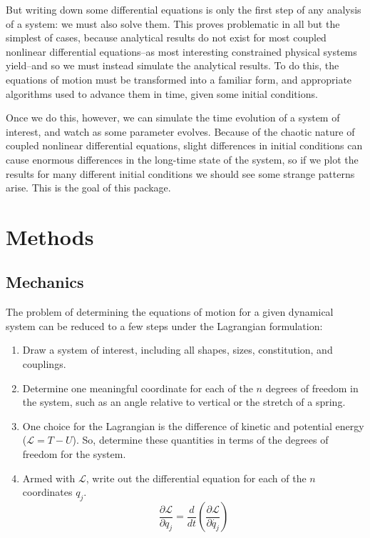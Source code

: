 \documentclass{article}
\newcommand{\lagrangian}{\ensuremath{\mathcal{L}}}
\newcommand{\ddt}{\frac{d}{dt}}
\begin{document}
But writing down some differential equations is only the first step of any analysis of a system: we must also solve them. This proves problematic in all but the simplest of cases, because analytical results do not exist for most coupled nonlinear differential equations--as most interesting constrained physical systems yield--and so we must instead simulate the analytical results. To do this, the equations of motion must be transformed into a familiar form, and appropriate algorithms used to advance them in time, given some initial conditions. 

Once we do this, however, we can simulate the time evolution of a system of interest, and watch as some parameter evolves. Because of the chaotic nature of coupled nonlinear differential equations, slight differences in initial conditions can cause enormous differences in the long-time state of the system, so if we plot the results for many different initial conditions we should see some strange patterns arise. This is the goal of this package.


\section{Methods}
\subsection{Mechanics}
The problem of determining the equations of motion for a given dynamical system can be reduced to a few steps under the Lagrangian formulation:
\begin{enumerate}[1.]
 \item Draw a system of interest, including all shapes, sizes, constitution, and couplings. 
 \item Determine one meaningful coordinate for each of the $n$ degrees of freedom in the system, such as an angle relative to vertical or the stretch of a spring.
 \item One choice for the Lagrangian is the difference of kinetic and potential energy ($\lagrangian=T-U$). So, determine these quantities in terms of the degrees of freedom for the system.
 \item Armed with \lagrangian, write out the differential equation for each of the $n$ coordinates $q_{j}$. 
  \begin{equation}
   \frac{\partial\lagrangian}{\partial q_{j}} = \ddt\left(\frac{\partial\lagrangian}{\partial\dot{q_{j}}}\right)
  \end{equation}
\end{enumerate}
\end{document}
